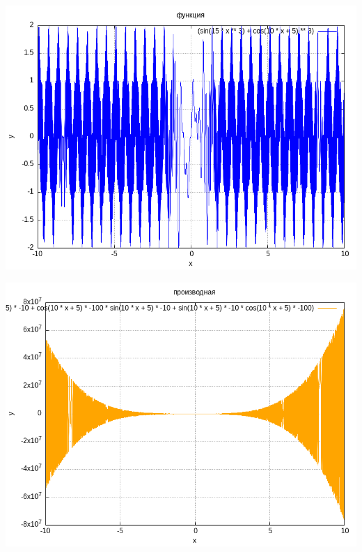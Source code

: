 \documentclass[12pt,a4paper]{extreport}
\begin{document}
\begin{minipage}{0.45\textwidth}
\centering\includegraphics[width=\linewidth]{out/orig_plot.png}\end{minipage}
\hfill
\begin{minipage}{0.45\textwidth}
\centering\includegraphics[width=\linewidth]{out/optimized_plot.png}\end{minipage}
\end{document}
